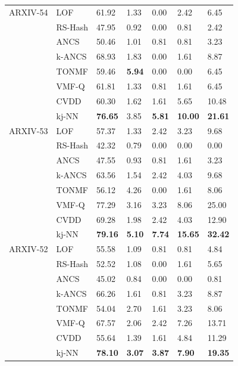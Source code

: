 \begin{table}
\begin{tabularx}{\columnwidth}{@{}XXXXXXX@{}}
ARXIV-54 & \gls{LOF}     & 61.92 & 1.33  & 0.00  & 2.42  & 6.45  \\
         & \gls{RS-Hash} & 47.95 & 0.92  & 0.00  & 0.81  & 2.42  \\
         & \gls{ANCS}     & 50.46 & 1.01  & 0.81  & 0.81  & 3.23  \\
         & \gls{k-ANCS}   & 68.93 &	1.83 &	0.00 &	1.61 &	8.87 	  \\
         & \gls{TONMF}   & 59.46 & \bfseries5.94  & 0.00  & 0.00  & 6.45     \\
         & \gls{VMF-Q}   & 61.81 & 1.33  & 0.81  & 1.61  & 6.45  \\
         & \gls{CVDD}     & 60.30	& 1.62	& 1.61	 &5.65	& 10.48  \\
         & \gls{kj-NN}   & \bfseries76.65 &	3.85 & \bfseries	5.81 & \bfseries	10.00 & \bfseries	21.61 \\ \midrule

ARXIV-53 & \gls{LOF}     & 57.37 & 1.33  & 2.42  & 3.23  & 9.68  \\
         & \gls{RS-Hash} & 42.32 & 0.79  & 0.00  & 0.00  & 0.00  \\
         & \gls{ANCS}     & 47.55 & 0.93  & 0.81  & 1.61  & 3.23  \\
         & \gls{k-ANCS}   & 63.56 &	1.54 &	2.42 &	4.03 &	9.68  \\
         & \gls{TONMF}   & 56.12 & 4.26  & 0.00  & 1.61  & 8.06      \\
         & \gls{VMF-Q}   & 77.29 & 3.16  & 3.23  & 8.06  & 25.00 \\
         & \gls{CVDD}     & 69.28	& 1.98 &	2.42 &	4.03 &	12.90  \\
         & \gls{kj-NN}   & \bfseries79.16 & \bfseries	5.10 & \bfseries	7.74 & \bfseries	15.65 & \bfseries	32.42 	 \\ \midrule

ARXIV-52 & \gls{LOF}     & 55.58 & 1.09  & 0.81  & 0.81  & 4.84  \\
         & \gls{RS-Hash} & 52.52 & 1.08  & 0.00  & 1.61  & 5.65  \\
         & \gls{ANCS}     & 45.02 & 0.84  & 0.00  & 0.00  & 0.81  \\
         & \gls{k-ANCS}   & 66.26 &	1.61 &	0.81 &	3.23 &	8.87 \\
         & \gls{TONMF}   & 54.04  & 	2.70 &	1.61 	& 3.23  &	8.06   \\
         & \gls{VMF-Q}   & 67.57 & 2.06  & 2.42  & 7.26  & 13.71 \\
         & \gls{CVDD}     & 55.64	& 1.39	& 1.61 &	4.84 &	11.29  \\
         & \gls{kj-NN}   & \bfseries 78.10 & \bfseries	3.07 & \bfseries	3.87 & \bfseries	7.90 & \bfseries	19.35 	\\ \midrule


\end{tabularx}
\end{table}
